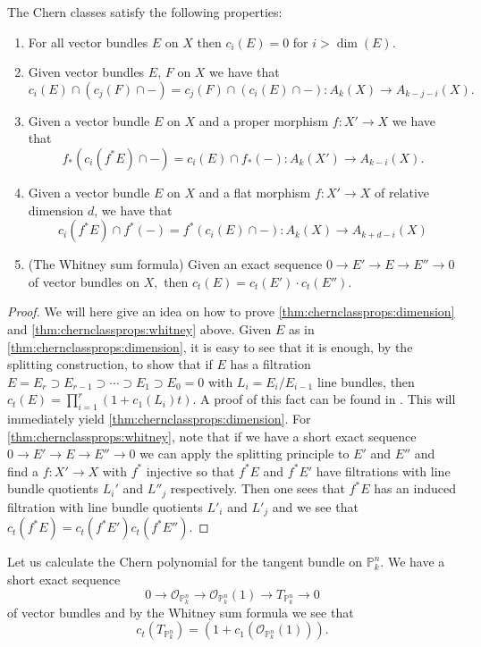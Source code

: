 \documentclass[a4paper,openany]{scrbook}
\begin{document}
\begin{thm} \label{thm:chernclassprops} The Chern classes satisfy the following properties: 
\begin{enumerate}
\item \label{thm:chernclassprops:dimension} For all vector bundles $E$ on $X$ then $c_i(E)=0$ for $i > \dim(E).$
\item Given vector bundles $E$, $F$ on $X$ we have that
\[
c_i(E) \cap (c_j(F) \cap -) = c_j(F) \cap (c_i(E) \cap - )\colon A_k(X) \rightarrow A_{k-j-i}(X).
\]
\item Given a vector bundle $E$ on $X$ and a proper morphism $f\colon X' \rightarrow X$  we have that
\[
f_\ast(c_i(f^\ast E) \cap -) = c_i(E) \cap f_\ast( - ) \colon A_k(X') \rightarrow A_{k-i}(X).
\]
\item Given a vector bundle $E$ on $X$ and a flat morphism $f\colon X' \rightarrow X$ of relative dimension $d$, we have that
\[
c_i(f^\ast E) \cap f^\ast (-) = f^\ast(c_i(E) \cap -)\colon A_k(X) \rightarrow A_{k+d-i}(X)
\]
\item \label{thm:chernclassprops:whitney} (The Whitney sum formula) Given an exact sequence $0 \to E' \to E \to E'' \to 0$ of vector bundles on $X,$ then $c_t(E) = c_t(E')\cdot c_t(E'').$
\end{enumerate}
\end{thm}
\begin{proof}
We will here give an idea on how to prove \eqref{thm:chernclassprops:dimension} and \eqref{thm:chernclassprops:whitney} above. Given $E$ as in \eqref{thm:chernclassprops:dimension}, it is easy to see that it is enough, by the splitting construction, to show that if $E$ has a filtration 
$E=E_r \supset E_{r-1} \supset \cdots \supset E_1 \supset E_0 = 0$ with $L_i = E_i/E_{i-1}$ line bundles, then $c_t(E) = \prod_{i=1}^r (1+c_1(L_i)t)$. A proof of this fact can be found in \cite[3.2.2]{fulton:intersection-theory}. This will immediately yield \eqref{thm:chernclassprops:dimension}. For \eqref{thm:chernclassprops:whitney}, note that if we have a short exact sequence $0 \to E' \to E \to E'' \to 0$ we can apply the splitting principle to $E'$ and $E''$ and find a $f\colon X' \rightarrow X$ with $f^\ast$ injective so that $f^\ast E$ and $f^\ast E'$ have filtrations with line bundle quotients $L_i'$ and $L''_j$ respectively. Then one sees that $f^\ast E$ has an induced filtration with line bundle quotients $L'_i$ and $L'_j$ and we see that $c_t(f^\ast E) = c_t(f^\ast E')c_t(f^\ast E'').$  
\end{proof}
\begin{example}
Let us calculate the Chern polynomial for the tangent bundle on $\mathbb{P}^n_k.$ We have a short exact sequence $$0 \to \mathcal{O}_{\mathbb{P}^n_k} \to \mathcal{O}_{\mathbb{P}^n_k}(1) \to T_{\mathbb{P}^n_k} \to 0 $$ of vector bundles and by the Whitney sum formula we see that $$c_t(T_{\mathbb{P}^n_k}) = (1+c_1(\mathcal{O}_{\mathbb{P}^n_k}(1))).$$
\end{example}
\end{document}
